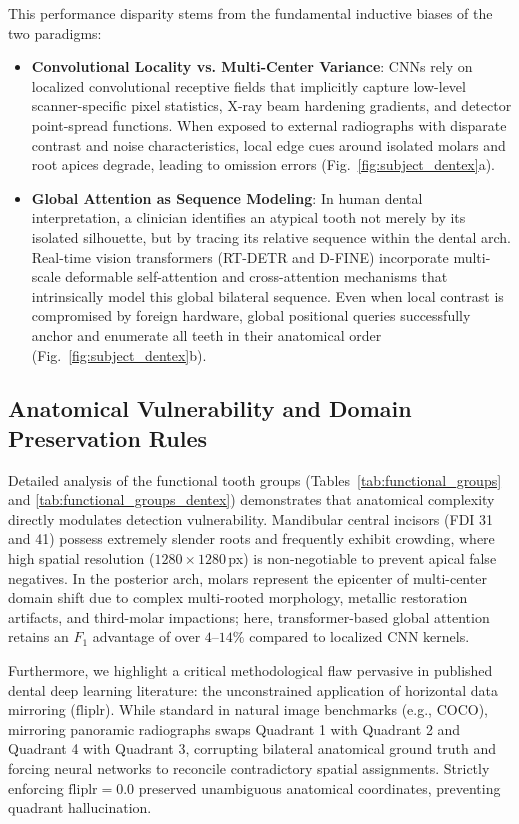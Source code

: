 \documentclass[10pt,journal,compsoc]{IEEEtran}
\begin{document}
This performance disparity stems from the fundamental inductive biases of the two paradigms:
\begin{itemize}
    \item \textbf{Convolutional Locality vs. Multi-Center Variance}: CNNs rely on localized convolutional receptive fields that implicitly capture low-level scanner-specific pixel statistics, X-ray beam hardening gradients, and detector point-spread functions. When exposed to external radiographs with disparate contrast and noise characteristics, local edge cues around isolated molars and root apices degrade, leading to omission errors (Fig.~\ref{fig:subject_dentex}a).
    \item \textbf{Global Attention as Sequence Modeling}: In human dental interpretation, a clinician identifies an atypical tooth not merely by its isolated silhouette, but by tracing its relative sequence within the dental arch. Real-time vision transformers (RT-DETR and D-FINE) incorporate multi-scale deformable self-attention and cross-attention mechanisms that intrinsically model this global bilateral sequence. Even when local contrast is compromised by foreign hardware, global positional queries successfully anchor and enumerate all teeth in their anatomical order (Fig.~\ref{fig:subject_dentex}b).
\end{itemize}

\subsection{Anatomical Vulnerability and Domain Preservation Rules}
Detailed analysis of the functional tooth groups (Tables~\ref{tab:functional_groups} and \ref{tab:functional_groups_dentex}) demonstrates that anatomical complexity directly modulates detection vulnerability. Mandibular central incisors (FDI 31 and 41) possess extremely slender roots and frequently exhibit crowding, where high spatial resolution ($1280 \times 1280$\,px) is non-negotiable to prevent apical false negatives. In the posterior arch, molars represent the epicenter of multi-center domain shift due to complex multi-rooted morphology, metallic restoration artifacts, and third-molar impactions; here, transformer-based global attention retains an $F_1$ advantage of over $4$--$14\%$ compared to localized CNN kernels.

Furthermore, we highlight a critical methodological flaw pervasive in published dental deep learning literature: the unconstrained application of horizontal data mirroring ($\text{fliplr}$). While standard in natural image benchmarks (e.g., COCO), mirroring panoramic radiographs swaps Quadrant 1 with Quadrant 2 and Quadrant 4 with Quadrant 3, corrupting bilateral anatomical ground truth and forcing neural networks to reconcile contradictory spatial assignments. Strictly enforcing $\text{fliplr} = 0.0$ preserved unambiguous anatomical coordinates, preventing quadrant hallucination.
\end{document}
